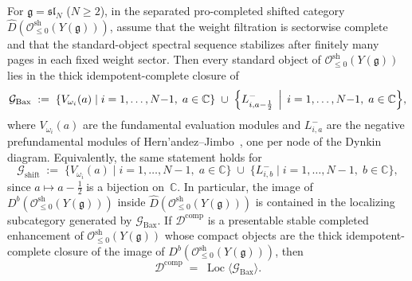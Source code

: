 \begin{theorem}
\label{thm:shifted-prefundamental-generation}
For $\mathfrak{g} = \mathfrak{sl}_N$ ($N \geq 2$), in the separated
pro-completed shifted category
$\widehat{D}(\mathcal{O}^{\mathrm{sh}}_{\leq 0}(Y(\mathfrak{g})))$,
assume that the weight filtration is sectorwise complete and that the
standard-object spectral sequence stabilizes after finitely many pages in
each fixed weight sector. Then
every standard object of
$\mathcal{O}^{\mathrm{sh}}_{\leq 0}(Y(\mathfrak{g}))$ lies in the
thick idempotent-complete closure of
\[
\mathcal{G}_{\mathrm{Bax}}
\;:=\;
\{V_{\omega_i}(a) \mid i = 1, \ldots, N{-}1,\; a \in \mathbb{C}\}
\;\cup\;
\Bigl\{L^-_{i,a-\frac{1}{2}}
 \,\Bigm|\, i = 1, \ldots, N{-}1,\; a \in \mathbb{C}\Bigr\},
\]
where $V_{\omega_i}(a)$ are the fundamental evaluation modules
and $L^-_{i,a}$ are the negative prefundamental modules of
Hern'andez--Jimbo~\cite{HJZ25}, one per node of the
Dynkin diagram. Equivalently, the same statement holds for
\[
\mathcal{G}_{\mathrm{shift}}
\;:=\;
\{V_{\omega_i}(a) \mid i = 1, \ldots, N{-}1,\; a \in \mathbb{C}\}
\;\cup\;
\{L^-_{i,b} \mid i = 1, \ldots, N{-}1,\; b \in \mathbb{C}\},
\]
since $a \mapsto a - \tfrac{1}{2}$ is a bijection on~$\mathbb{C}$.
In particular, the image of
$D^b(\mathcal{O}^{\mathrm{sh}}_{\leq 0}(Y(\mathfrak{g})))$ inside
$\widehat{D}(\mathcal{O}^{\mathrm{sh}}_{\leq 0}(Y(\mathfrak{g})))$
is contained in the localizing subcategory generated by
$\mathcal{G}_{\mathrm{Bax}}$.
If $\mathcal{D}^{\mathrm{comp}}$ is a presentable stable
completed enhancement of
$\mathcal{O}^{\mathrm{sh}}_{\leq 0}(Y(\mathfrak{g}))$ whose compact
objects are the thick idempotent-complete closure of the image of
$D^b(\mathcal{O}^{\mathrm{sh}}_{\leq 0}(Y(\mathfrak{g})))$, then
\[
\mathcal{D}^{\mathrm{comp}}
\;=\;
\operatorname{Loc}\langle \mathcal{G}_{\mathrm{Bax}} \rangle.
\]
\end{theorem}

